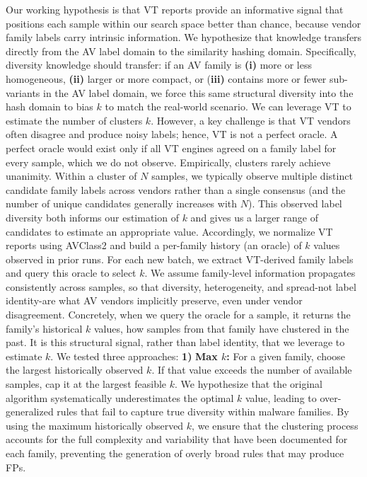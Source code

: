 \noindent Our working hypothesis is that VT reports provide an informative signal that positions each sample within our search space better than chance, because vendor family labels carry intrinsic information. We hypothesize that knowledge transfers directly from the AV label domain to the similarity hashing domain. Specifically, diversity knowledge should transfer: if an AV family is \textbf{(i)} more or less homogeneous, \textbf{(ii)} larger or more compact, or (\textbf{iii)} contains more or fewer sub-variants in the AV label domain, we force this same structural diversity into the hash domain to bias $k$ to match the real-world scenario. We can leverage VT to estimate the number of clusters $k$. However, a key challenge is that VT vendors often disagree and produce noisy labels; hence, VT is not a perfect oracle. A perfect oracle would exist only if all VT engines agreed on a family label for every sample, which we do not observe. Empirically, clusters rarely achieve unanimity. Within a cluster of $N$ samples, we typically observe multiple distinct candidate family labels across vendors rather than a single consensus (and the number of unique candidates generally increases with $N$). This observed label diversity both informs our estimation of $k$ and gives us a larger range of candidates to estimate an appropriate value. Accordingly, we normalize VT reports using AVClass2 \cite{DBLP:journals/corr/abs-2006-10615} and build a per-family history (an oracle) of $k$ values observed in prior runs. For each new batch, we extract VT-derived family labels and query this oracle to select $k$. We assume family-level information propagates consistently across samples, so that diversity, heterogeneity, and spread-not label identity-are what AV vendors implicitly preserve, even under vendor disagreement. Concretely, when we query the oracle for a sample, it returns the family's historical $k$ values, how samples from that family have clustered in the past. It is this structural signal, rather than label identity, that we leverage to estimate $k$. We tested three approaches:\newline
\noindent \textbf{1)} \textbf{Max $k$:} For a given family, choose the largest historically observed $k$. If that value exceeds the number of available samples, cap it at the largest feasible $k$. We hypothesize that the original algorithm systematically underestimates the optimal $k$ value, leading to over-generalized rules that fail to capture true diversity within malware families. By using the maximum historically observed $k$, we ensure that the clustering process accounts for the full complexity and variability that have been documented for each family, preventing the generation of overly broad rules that may produce FPs. \newline
